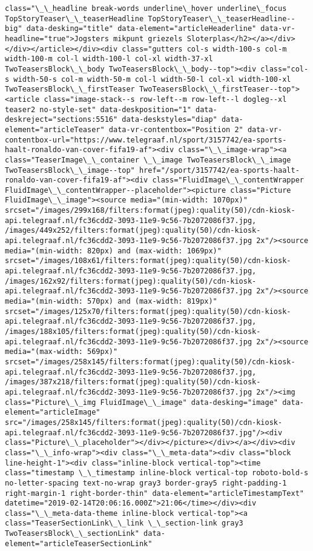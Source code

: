 \documentclass[11pt]{article}
\begin{document}
\begin{Verbatim}[commandchars=\\\{\}]
class="\_\_headline break-words underline\_hover underline\_focus TopStoryTeaser\_\_teaserHeadline TopStoryTeaser\_\_teaserHeadline--big" data-desking="title" data-element="articleHeaderline" data-vr-headline="true">Jogsters mikpunt griezels Sloterplas</h2></a></div></div></article></div><div class="gutters col-s width-100-s col-m width-100-m col-l width-100-l col-xl width-37-xl TwoTeasersBlock\_\_body TwoTeasersBlock\_\_body--top"><div class="col-s width-50-s col-m width-50-m col-l width-50-l col-xl width-100-xl TwoTeasersBlock\_\_firstTeaser TwoTeasersBlock\_\_firstTeaser--top"><article class="image-stack--s row-left--m row-left--l dogleg--xl teaser2 no-style-set" data-deskposition="1" data-deskreject="sections:5516" data-deskstyles="diap" data-element="articleTeaser" data-vr-contentbox="Position 2" data-vr-contentbox-url="https://www.telegraaf.nl/sport/3157742/ea-sports-haalt-ronaldo-van-cover-fifa19-af"><div class="\_\_image-wrap"><a class="TeaserImage\_\_container \_\_image TwoTeasersBlock\_\_image TwoTeasersBlock\_\_image--top" href="/sport/3157742/ea-sports-haalt-ronaldo-van-cover-fifa19-af"><div class="FluidImage\_\_contentWrapper FluidImage\_\_contentWrapper--placeholder"><picture class="Picture FluidImage\_\_image"><source media="(min-width: 1070px)" srcset="/images/299x168/filters:format(jpeg):quality(50)/cdn-kiosk-api.telegraaf.nl/fc36cdd2-3093-11e9-9c56-7b2072086f37.jpg, /images/449x252/filters:format(jpeg):quality(50)/cdn-kiosk-api.telegraaf.nl/fc36cdd2-3093-11e9-9c56-7b2072086f37.jpg 2x"/><source media="(min-width: 820px) and (max-width: 1069px)" srcset="/images/108x61/filters:format(jpeg):quality(50)/cdn-kiosk-api.telegraaf.nl/fc36cdd2-3093-11e9-9c56-7b2072086f37.jpg, /images/162x92/filters:format(jpeg):quality(50)/cdn-kiosk-api.telegraaf.nl/fc36cdd2-3093-11e9-9c56-7b2072086f37.jpg 2x"/><source media="(min-width: 570px) and (max-width: 819px)" srcset="/images/125x70/filters:format(jpeg):quality(50)/cdn-kiosk-api.telegraaf.nl/fc36cdd2-3093-11e9-9c56-7b2072086f37.jpg, /images/188x105/filters:format(jpeg):quality(50)/cdn-kiosk-api.telegraaf.nl/fc36cdd2-3093-11e9-9c56-7b2072086f37.jpg 2x"/><source media="(max-width: 569px)" srcset="/images/258x145/filters:format(jpeg):quality(50)/cdn-kiosk-api.telegraaf.nl/fc36cdd2-3093-11e9-9c56-7b2072086f37.jpg, /images/387x218/filters:format(jpeg):quality(50)/cdn-kiosk-api.telegraaf.nl/fc36cdd2-3093-11e9-9c56-7b2072086f37.jpg 2x"/><img class="Picture\_\_img FluidImage\_\_image" data-desking="image" data-element="articleImage" src="/images/258x145/filters:format(jpeg):quality(50)/cdn-kiosk-api.telegraaf.nl/fc36cdd2-3093-11e9-9c56-7b2072086f37.jpg"/><div class="Picture\_\_placeholder"></div></picture></div></a></div><div class="\_\_info-wrap"><div class="\_\_meta-data"><div class="block line-height-1"><div class="inline-block vertical-top"><time class="timestamp \_\_timestamp inline-block vertical-top roboto-bold-s no-letter-spacing text-no-wrap gray3 border-gray5 right-padding-1 right-margin-1 right-border-thin" data-element="articleTimestampText" datetime="2019-02-14T20:06:16.000Z">21:06</time></div><div class="\_\_meta-data-theme inline-block vertical-top"><a class="TeaserSectionLink\_\_link \_\_section-link gray3 TwoTeasersBlock\_\_sectionLink" data-element="articleTeaserSectionLink" 
\end{Verbatim}
\end{document}
